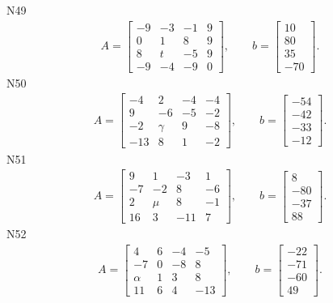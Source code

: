 \documentclass[11pt]{report}
\begin{document}
N49
\begin{align*}
 A = \left[\begin{matrix}-9 & -3 & -1 & 9\\0 & 1 & 8 & 9\\8 & t & -5 & 9\\-9 & -4 & -9 & 0\end{matrix}\right],
\qquad b = \left[\begin{matrix}10\\80\\35\\-70\end{matrix}\right]. 
 \end{align*}
N50
\begin{align*}
 A = \left[\begin{matrix}-4 & 2 & -4 & -4\\9 & -6 & -5 & -2\\-2 & \gamma & 9 & -8\\-13 & 8 & 1 & -2\end{matrix}\right],
\qquad b = \left[\begin{matrix}-54\\-42\\-33\\-12\end{matrix}\right]. 
 \end{align*}
N51
\begin{align*}
 A = \left[\begin{matrix}9 & 1 & -3 & 1\\-7 & -2 & 8 & -6\\2 & \mu & 8 & -1\\16 & 3 & -11 & 7\end{matrix}\right],
\qquad b = \left[\begin{matrix}8\\-80\\-37\\88\end{matrix}\right]. 
 \end{align*}
N52
\begin{align*}
 A = \left[\begin{matrix}4 & 6 & -4 & -5\\-7 & 0 & -8 & 8\\\alpha & 1 & 3 & 8\\11 & 6 & 4 & -13\end{matrix}\right],
\qquad b = \left[\begin{matrix}-22\\-71\\-60\\49\end{matrix}\right]. 
 \end{align*}
\end{document}
